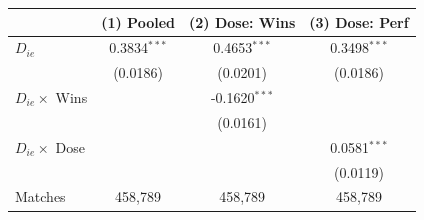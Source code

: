 \begin{tabular}{lccc}
\toprule
 & (1) Pooled & (2) Dose: Wins & (3) Dose: Perf \\
\midrule
$D_{ie}$ & 0.3834$^{***}$ & 0.4653$^{***}$ & 0.3498$^{***}$ \\
 & (0.0186) & (0.0201) & (0.0186) \\
$D_{ie} \times$ Wins &  & -0.1620$^{***}$ &  \\
 &  & (0.0161) &  \\
$D_{ie} \times$ Dose &  &  & 0.0581$^{***}$ \\
 &  &  & (0.0119) \\
\midrule
Matches & 458,789 & 458,789 & 458,789 \\
\bottomrule
\end{tabular}
